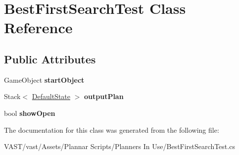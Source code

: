\hypertarget{class_best_first_search_test}{\section{Best\-First\-Search\-Test Class Reference}
\label{class_best_first_search_test}
}
\subsection*{Public Attributes}
\begin{DoxyCompactItemize}
\item 
\hypertarget{class_best_first_search_test_ab3ca8278a5ebb3b0d8499f0fa53536ee}{Game\-Object {\bfseries start\-Object}}\label{class_best_first_search_test_ab3ca8278a5ebb3b0d8499f0fa53536ee}

\item 
\hypertarget{class_best_first_search_test_a1b520839cef79307953cb12736c80668}{Stack$<$ \hyperlink{class_default_state}{Default\-State} $>$ {\bfseries output\-Plan}}\label{class_best_first_search_test_a1b520839cef79307953cb12736c80668}

\item 
\hypertarget{class_best_first_search_test_ab2b49116e05989966e1b9aefa0719d6e}{bool {\bfseries show\-Open}}\label{class_best_first_search_test_ab2b49116e05989966e1b9aefa0719d6e}

\end{DoxyCompactItemize}


The documentation for this class was generated from the following file\-:\begin{DoxyCompactItemize}
\item 
V\-A\-S\-T/vast/\-Assets/\-Plannar Scripts/\-Planners In Use/Best\-First\-Search\-Test.\-cs\end{DoxyCompactItemize}
